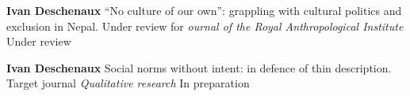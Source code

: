 


\begin{cvpublications}

  \cvpublication
  {\textbf{Ivan Deschenaux}}
  {``No culture of our own'': grappling with cultural politics and exclusion in Nepal. Under review for \textit{ournal of the Royal Anthropological Institute}} %
  {Under review} %

  \cvpublication
  {\textbf{Ivan Deschenaux}}
  {Social norms without intent: in defence of thin description. Target journal \textit{Qualitative research}} %
  {In preparation} %


\end{cvpublications}


